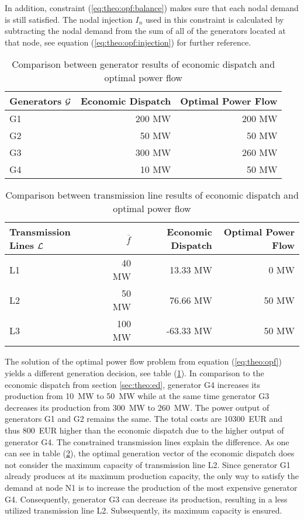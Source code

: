 In addition, constraint (\ref{eq:theo:opf:balance}) makes sure that each nodal demand is still satisfied. The nodal injection $I_n$ used in this constraint is calculated by subtracting the nodal demand from the sum of all of the generators located at that node, see equation (\ref{eq:theo:opf:injection}) for further reference.

\begin{table}[h!]
    \centering
    \begin{tabular}{lrr}
        Generators $\mathcal{G}$ & Economic Dispatch & Optimal Power Flow \\ \toprule
        G1 & 200 MW & 200 MW \\
        G2 & 50 MW & 50 MW \\
        G3 & 300 MW & 260 MW \\
        G4 & 10 MW & 50 MW \\
        \bottomrule
    \end{tabular}
    \caption{Comparison between generator results of economic dispatch and optimal power flow}
    \label{tab:theo:gen-comparison}
\end{table}

\begin{table}[h!]
    \centering
    \begin{tabular}{lrrr}
        Transmission Lines $\mathcal{L}$ & $\overline{f}$ & Economic Dispatch & Optimal Power Flow \\ \toprule
        L1 & 40 MW & 13.33 MW & 0 MW \\
        L2 & 50 MW & 76.66 MW & 50 MW \\
        L3 & 100 MW & -63.33 MW & 50 MW \\
        \bottomrule
    \end{tabular}
    \caption{Comparison between transmission line results of economic dispatch and optimal power flow}
    \label{tab:theo:line-comparison}
\end{table}

The solution of the optimal power flow problem from equation (\ref{eq:theo:opf}) yields a different generation decision, see table (\ref{tab:theo:gen-comparison}). In comparison to the economic dispatch from section \ref{sec:theo:ed}, generator G4 increases its production from \SI{10}{\mega\watt} to \SI{50}{\mega\watt} while at the same time generator G3 decreases its production from \SI{300}{\mega\watt} to \SI{260}{\mega\watt}. The power output of generators G1 and G2 remains the same. The total costs are \SI{10300}{EUR} and thus \SI{800}{EUR} higher than the economic dispatch due to the higher output of generator G4. The constrained transmission lines explain the difference. As one can see in table (\ref{tab:theo:line-comparison}), the optimal generation vector of the economic dispatch does not consider the maximum capacity of transmission line L2. Since generator G1 already produces at its maximum production capacity, the only way to satisfy the demand at node N1 is to increase the production of the most expensive generator G4. Consequently, generator G3 can decrease its production, resulting in a less utilized transmission line L2. Subsequently, its maximum capacity is ensured. \\

